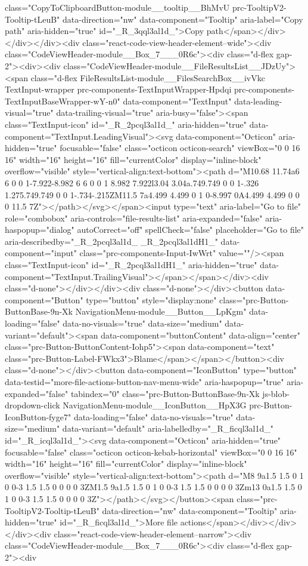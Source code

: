 {{{{{class="CopyToClipboardButton-module__tooltip__BhMvU prc-TooltipV2-Tooltip-tLeuB" data-direction="nw" data-component="Tooltip" aria-label="Copy path" aria-hidden="true" id="_R_3qql3al1d_">Copy path</span></div></div></div><div class="react-code-view-header-element--wide"><div class="CodeViewHeader-module__Box_7___0R6c"><div class="d-flex gap-2"><div><div class="CodeViewHeader-module__FileResultsList__JDzUy"><span class="d-flex FileResultsList-module__FilesSearchBox__ivVkc TextInput-wrapper prc-components-TextInputWrapper-Hpdqi prc-components-TextInputBaseWrapper-wY-n0" data-component="TextInput" data-leading-visual="true" data-trailing-visual="true" aria-busy="false"><span class="TextInput-icon" id="_R_2pcql3al1d_" aria-hidden="true" data-component="TextInput.LeadingVisual"><svg data-component="Octicon" aria-hidden="true" focusable="false" class="octicon octicon-search" viewBox="0 0 16 16" width="16" height="16" fill="currentColor" display="inline-block" overflow="visible" style="vertical-align:text-bottom"><path d="M10.68 11.74a6 6 0 0 1-7.922-8.982 6 6 0 0 1 8.982 7.922l3.04 3.04a.749.749 0 0 1-.326 1.275.749.749 0 0 1-.734-.215ZM11.5 7a4.499 4.499 0 1 0-8.997 0A4.499 4.499 0 0 0 11.5 7Z"></path></svg></span><input type="text" aria-label="Go to file" role="combobox" aria-controls="file-results-list" aria-expanded="false" aria-haspopup="dialog" autoCorrect="off" spellCheck="false" placeholder="Go to file" aria-describedby="_R_2pcql3al1d_ _R_2pcql3al1dH1_" data-component="input" class="prc-components-Input-IwWrt" value=""/><span class="TextInput-icon" id="_R_2pcql3al1dH1_" aria-hidden="true" data-component="TextInput.TrailingVisual"></span></span></div><div class="d-none"></div></div><div class="d-none"></div><button data-component="Button" type="button" style="display:none" class="prc-Button-ButtonBase-9n-Xk NavigationMenu-module__Button__LpKgm" data-loading="false" data-no-visuals="true" data-size="medium" data-variant="default"><span data-component="buttonContent" data-align="center" class="prc-Button-ButtonContent-Iohp5"><span data-component="text" class="prc-Button-Label-FWkx3">Blame</span></span></button><div class="d-none"></div><button data-component="IconButton" type="button" data-testid="more-file-actions-button-nav-menu-wide" aria-haspopup="true" aria-expanded="false" tabindex="0" class="prc-Button-ButtonBase-9n-Xk js-blob-dropdown-click NavigationMenu-module__IconButton__HpX3G prc-Button-IconButton-fyge7" data-loading="false" data-no-visuals="true" data-size="medium" data-variant="default" aria-labelledby="_R_ficql3al1d_" id="_R_icql3al1d_"><svg data-component="Octicon" aria-hidden="true" focusable="false" class="octicon octicon-kebab-horizontal" viewBox="0 0 16 16" width="16" height="16" fill="currentColor" display="inline-block" overflow="visible" style="vertical-align:text-bottom"><path d="M8 9a1.5 1.5 0 1 0 0-3 1.5 1.5 0 0 0 0 3ZM1.5 9a1.5 1.5 0 1 0 0-3 1.5 1.5 0 0 0 0 3Zm13 0a1.5 1.5 0 1 0 0-3 1.5 1.5 0 0 0 0 3Z"></path></svg></button><span class="prc-TooltipV2-Tooltip-tLeuB" data-direction="nw" data-component="Tooltip" aria-hidden="true" id="_R_ficql3al1d_">More file actions</span></div></div></div><div class="react-code-view-header-element--narrow"><div class="CodeViewHeader-module__Box_7___0R6c"><div class="d-flex gap-2"><div }}}}}
